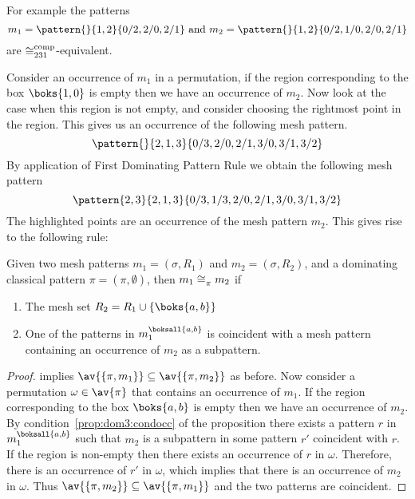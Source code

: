 For example the patterns
\begin{equation*}
    m_1 = \pattern{}{1,2}{0/2,2/0,2/1} \text{ and } m_2 = \pattern{}{1,2}{0/2,1/0,2/0,2/1}
\end{equation*}
are \(\coinc[comp]{231}\)-equivalent.

Consider an occurrence of \(m_1\) in a permutation, if the region corresponding
to the box \(\boks{1,0}\) is empty then we have an occurrence of \(m_2\). Now
look at the case when this region is not empty, and consider choosing the
rightmost point in the region. This gives us an occurrence of the following mesh
pattern.
\begin{equation*}
    \pattern{}{2,1,3}{0/3,2/0,2/1,3/0,3/1,3/2}
\end{equation*}
By application of First Dominating Pattern Rule we obtain the following mesh
pattern
\begin{equation*}
    \pattern{2,3}{2,1,3}{0/3,1/3,2/0,2/1,3/0,3/1,3/2}
\end{equation*}
The highlighted points are an occurrence of the mesh pattern \(m_2\). This gives
rise to the following rule:

\begin{proposition}
    \label{prop:dom3}
    Given two mesh patterns \(m_1 =(\sigma, R_1)\) and \(m_2 = (\sigma, R_2)\),
    and a dominating classical pattern \(\pi = (\pi,\emptyset)\), then
    \(m_1 \coinc{\pi} m_2\) if
    \begin{enumerate}
        \item The mesh set \(R_2 = R_1 \cup \{\boks{a,b}\}\)
        \item\label{prop:dom3:condocc} One of the patterns in \(m_1^\boksall{a,b}\)
            is coincident with a mesh pattern containing an occurrence of
            \(m_2\) as a subpattern.
    \end{enumerate}
\end{proposition}
\begin{proof}
     implies \(\av{\{\pi,m_1\}} \subseteq \av{\{\pi,m_2\}}\)
as before. Now consider a permutation \(\omega \in \av{\pi}\) that contains an
occurrence of \(m_1\). If the region corresponding to the box \(\boks{a,b}\) is
empty then we have an occurrence of \(m_2\). By
condition~\ref{prop:dom3:condocc} of the proposition there exists a pattern
\(r\) in \(m_1^\boksall{a,b}\) such that \(m_2\) is a subpattern in some pattern
\(r'\) coincident with \(r\). If the region is non-empty then there exists an
occurrence of \(r\) in \(\omega\). Therefore, there is an occurrence of \(r'\) in
\(\omega\), which implies that there is an occurrence of \(m_2\) in \(\omega\).
Thus \(\av{\{\pi,m_2\}} \subseteq \av{\{\pi,m_1\}}\) and the two patterns are
coincident.
\end{proof}

